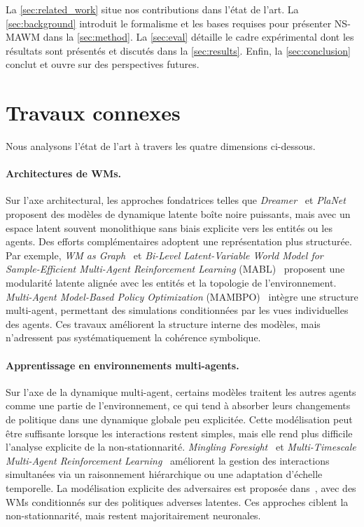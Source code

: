 \documentclass[final]{jfsma}
\theoremstyle{plain}
\theoremstyle{definition}
\theoremstyle{remark}
\begin{document}
La \autoref{sec:related_work} situe nos contributions dans l'état de l'art. La \autoref{sec:background} introduit le formalisme et les bases requises pour présenter NS-MAWM dans la \autoref{sec:method}. La \autoref{sec:eval} détaille le cadre expérimental dont les résultats sont présentés et discutés dans la \autoref{sec:results}. Enfin, la \autoref{sec:conclusion} conclut et ouvre sur des perspectives futures.



\section{Travaux connexes}
\label{sec:related_work}

Nous analysons l'état de l'art à travers les quatre dimensions ci-dessous.

\paragraph{Architectures de WMs.} Sur l'axe architectural, les approches fondatrices telles que \emph{Dreamer}~\cite{hafner2020dreamer, hafner2021dreamerv2} et \emph{PlaNet}~\cite{hafner2019learning} proposent des modèles de dynamique latente boîte noire puissants, mais avec un espace latent souvent monolithique sans biais explicite vers les entités ou les agents. Des efforts complémentaires adoptent une représentation plus structurée. Par exemple, \emph{WM as Graph}~\cite{zhang2021worldmodelgraph} et \emph{Bi-Level Latent-Variable World Model for Sample-Efficient Multi-Agent Reinforcement Learning} (MABL)~\cite{Venugopal2024MABL} proposent une modularité latente alignée avec les entités et la topologie de l'environnement. \emph{Multi-Agent Model-Based Policy Optimization} (MAMBPO)~\cite{Willemsen2021MAMBPO} intègre une structure multi-agent, permettant des simulations conditionnées par les vues individuelles des agents. Ces travaux améliorent la structure interne des modèles, mais n'adressent pas systématiquement la cohérence symbolique.

\paragraph{Apprentissage en environnements multi-agents.} Sur l'axe de la dynamique multi-agent, certains modèles traitent les autres agents comme une partie de l'environnement, ce qui tend à absorber leurs changements de politique dans une dynamique globale peu explicitée. Cette modélisation peut être suffisante lorsque les interactions restent simples, mais elle rend plus difficile l'analyse explicite de la non-stationnarité. \emph{Mingling Foresight}~\cite{Xu2022mingling} et \emph{Multi-Timescale Multi-Agent Reinforcement Learning}~\cite{nekoei2023dealing} améliorent la gestion des interactions simultanées via un raisonnement hiérarchique ou une adaptation d'échelle temporelle. La modélisation explicite des adversaires est proposée dans~\cite{Yuxiaopeng2022modelbased}, avec des WMs conditionnés sur des politiques adverses latentes. Ces approches ciblent la non-stationnarité, mais restent majoritairement neuronales.
\end{document}
